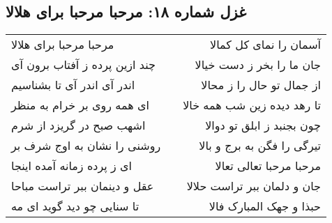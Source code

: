 \begin{center}
\section*{غزل شماره ۱۸: مرحبا مرحبا برای هلالا}
\label{sec:018}
\begin{longtable}{l p{0.5cm} r}
مرحبا مرحبا برای هلالا
&&
آسمان را نمای کل کمالا
\\
چند ازین پرده ز آفتاب برون آی
&&
جان ما را بخر ز دست خیالا
\\
اندر آی اندر آی تا بشناسیم
&&
از جمال تو حال را ز محالا
\\
ای همه روی بر خرام به منظر
&&
تا رهد دیده زین شب همه خالا
\\
اشهب صبح در گریزد از شرم
&&
چون بجنبد ز ابلق تو دوالا
\\
روشنی را نشان به اوج شرف بر
&&
تیرگی را فگن به برج و بالا
\\
ای ز پرده زمانه آمده اینجا
&&
مرحبا مرحبا تعالی تعالا
\\
عقل و دینمان ببر تراست مباحا
&&
جان و دلمان ببر تراست حلالا
\\
تا سنایی چو دید گوید ای مه
&&
حبذا و جهک المبارک فالا
\\
\end{longtable}
\end{center}
